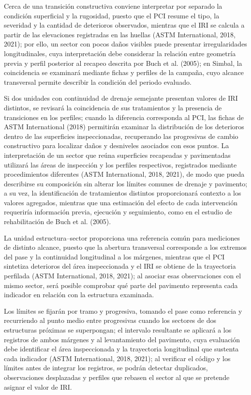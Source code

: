 Cerca de una transición constructiva conviene interpretar por separado la condición superficial y la rugosidad, puesto que el PCI resume el tipo, la severidad y la cantidad de deterioros observados, mientras que el IRI se calcula a partir de las elevaciones registradas en las huellas (ASTM International, 2018, 2021); por ello, un sector con pocos daños visibles puede presentar irregularidades longitudinales, cuya interpretación debe considerar la relación entre geometría previa y perfil posterior al recapeo descrita por Buch et al. (2005); en Simbal, la coincidencia se examinará mediante fichas y perfiles de la campaña, cuyo alcance transversal permite describir la condición del periodo evaluado.

Si dos unidades con continuidad de drenaje semejante presentan valores de IRI distintos, se revisará la coincidencia de sus tratamientos y la presencia de transiciones en los perfiles; cuando la diferencia corresponda al PCI, las fichas de ASTM International (2018) permitirán examinar la distribución de los deterioros dentro de las superficies inspeccionadas, recuperando las progresivas de cambio constructivo para localizar daños y desniveles asociados con esos puntos. La interpretación de un sector que reúna superficies recapeadas y pavimentadas utilizará las áreas de inspección y los perfiles respectivos, registrados mediante procedimientos diferentes (ASTM International, 2018, 2021), de modo que pueda describirse su composición sin alterar los límites comunes de drenaje y pavimento; a su vez, la identificación de tratamientos distintos proporcionará contexto a los valores agregados, mientras que una estimación del efecto de cada intervención requeriría información previa, ejecución y seguimiento, como en el estudio de rehabilitación de Buch et al. (2005).


La unidad estructura–sector proporciona una referencia común para mediciones de distinto alcance, puesto que la abertura transversal corresponde a los extremos del pase y la continuidad longitudinal a los márgenes, mientras que el PCI sintetiza deterioros del área inspeccionada y el IRI se obtiene de la trayectoria perfilada (ASTM International, 2018, 2021); al asociar esas observaciones con el mismo sector, será posible comprobar qué parte del pavimento representa cada indicador en relación con la estructura examinada.

Los límites se fijarán por tramo y progresiva, tomando el pase como referencia y recurriendo al punto medio entre progresivas cuando los sectores de dos estructuras próximas se superpongan; el intervalo resultante se aplicará a los registros de ambos márgenes y al levantamiento del pavimento, cuya evaluación debe identificar el área inspeccionada y la trayectoria longitudinal que sustenta cada indicador (ASTM International, 2018, 2021); al verificar el código y los límites antes de integrar los registros, se podrán detectar duplicados, observaciones desplazadas y perfiles que rebasen el sector al que se pretende asignar el valor de IRI.

